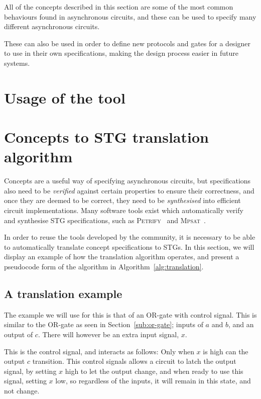 \documentclass[british,conference,compsoc]{IEEEtran}
\newcommand{\noun}[1]{\textsc{#1}}
\begin{document}
\noindent All of the concepts described in this section are some of the most
common behaviours found in asynchronous circuits, and these can be used
to specify many different asynchronous circuits. 

These can also be used in order to define new protocols and gates for a designer
to use in their own specifications, making the design process easier in future 
systems. 

\section{Usage of the tool\label{sec:tool-use}}

\section{Concepts to STG translation algorithm\label{sec:algorithm}}

Concepts are a useful way of specifying asynchronous circuits, but
specifications also need to be \emph{verified} against certain properties to
ensure their correctness, and once they are deemed to be correct, they need to
be \emph{synthesised} into efficient circuit implementations. Many software
tools exist which automatically verify and synthesise STG specifications,
such as \noun{Petrify}~\cite{Cortadella} and
\noun{Mpsat}~\cite{khomenko2004detecting}.

In order to reuse the tools developed by the community, it is
necessary to be able to automatically translate concept specifications to STGs.
In this section, we will display an example of how the translation algorithm 
operates, and present a pseudocode form of the algorithm in Algorithm~\ref{alg:translation}. 


\subsection{A translation example}

The example we will use for this is that of an OR-gate with control signal. 
This is similar to the OR-gate as seen in Section~\ref{sub:or-gate}; inputs
of $a$ and $b$, and an output of $c$. There will however be an extra 
input signal, $x$. 

This is the control signal, and interacts as follows:
Only when $x$ is high can the output $c$ transition. This control signals
allows a circuit to latch the output signal, by setting $x$ high to let
the output change, and when ready to use this signal, setting $x$ low,
so regardless of the inputs, it will remain in this state, and not change.
\end{document}

